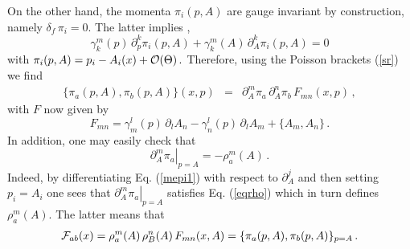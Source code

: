 \documentclass[12pt,a4paper]{article}
\numberwithin{equation}{section}
\theoremstyle{definition}
\begin{document}
On the other hand, the momenta $\pi_i(p,A)$ are gauge invariant by construction, namely $\delta_f\,\pi_i=0$. The latter  implies \cite{BKK},
\begin{equation}\label{mepi1}
\gamma^m_k(p)\,\partial^k_p\pi_i(p,A)+\gamma^m_k(A)\,\partial^k_A\pi_i(p,A)=0
\end{equation}
with $ \pi_i(p,A)=p_i-A_i(x)+{\cal O}(\Theta)\,.$
Therefore, using the Poisson brackets (\ref{sr})%
 we find
\begin{eqnarray}\label{pbl2}
\{\pi_a(p,A),\pi_b(p,A)\}(x,p)&=&\partial_A^m \pi_a\,\partial_A^n\pi_b\,F_{mn}(x,p)\,,
\end{eqnarray}
with $F$ now given by
\begin{equation}\label{Fstr}
F_{mn}=\gamma_m^l(p)\,\partial_lA_n-\gamma_n^l(p)\,\partial_lA_m+\{A_m,A_n\}\,.
\end{equation}
In addition, one may easily check that
\begin{equation}\label{defrho}
\left.\partial_A^m \pi_a\right|_{p=A}=-\rho^m_a(A)\,.
\end{equation}
Indeed, by  differentiating Eq. (\ref{mepi1}) with respect to $\partial_A^j$ and then setting $p_i=A_i$ one sees that $\left.\partial_A^m \pi_a\right|_{p=A}$ satisfies Eq. (\ref{eqrho}) which in turn defines $\rho^m_a(A)$.
The latter means that \cite{Kupriyanov:2021aet}
\begin{eqnarray}\label{Fcalpi}
{\cal F}_{ab}(x)=\rho_a^m(A)\,\rho_B^n(A)\,F_{mn}(x,A)=\{\pi_a(p,A),\pi_b(p,A)\}_{p=A}\,.
\end{eqnarray}
\end{document}
